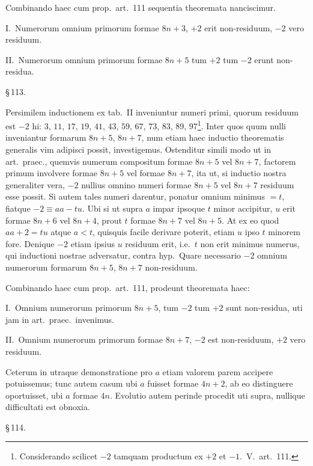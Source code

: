 \documentclass[12pt,a4paper]{article}
\theoremstyle{plain}
\theoremstyle{definition}
\theoremstyle{remark}
\begin{document}
Combinando haec cum prop.\ art.~111 sequentia theoremata nanciscimur.

\textsc{I.}\ Numerorum omnium primorum formae $8n+3$, $+2$ erit non-residuum, $-2$ vero residuum.

\textsc{II.}\ Numerorum omnium primorum formae $8n+5$ tum $+2$ tum $-2$ erunt non-residua.

\begin{center}\S\,113.\end{center}

Persimilem inductionem ex tab.\ II inveniuntur numeri primi, quorum residuum est $-2$ hi: $3$, $11$, $17$, $19$, $41$, $43$, $59$, $67$, $73$, $83$, $89$, $97$\footnote{Considerando scilicet $-2$ tamquam productum ex $+2$ et $-1$.\ V.\ art.~111.}. Inter quos quum nulli inveniantur formarum $8n+5$, $8n+7$, num etiam haec inductio theorematis generalis vim adipisci possit, investigemus. Ostenditur simili modo ut in art.\ praec., quemvis numerum compositum formae $8n+5$ vel $8n+7$, factorem primum involvere formae $8n+5$ vel formae $8n+7$, ita ut, si inductio nostra generaliter vera, $-2$ nullius omnino numeri formae $8n+5$ vel $8n+7$ residuum esse possit. Si autem tales numeri darentur, ponatur omnium minimus $= t$, fiatque $-2 \equiv aa - tu$. Ubi si ut supra $a$ impar ipsoque $t$ minor accipitur, $u$ erit formae $8n+6$ vel $8n+4$, prout $t$ formae $8n+7$ vel $8n+5$. At ex eo quod $aa + 2 = tu$ atque $a < t$, quisquis facile derivare poterit, etiam $u$ ipso $t$ minorem fore. Denique $-2$ etiam ipsius $u$ residuum erit, i.e.\ $t$ non erit minimus numerus, qui inductioni nostrae adversatur, contra hyp.\ Quare necessario $-2$ omnium numerorum formarum $8n+5$, $8n+7$ non-residuum.

Combinando haec cum prop.\ art.~111, prodeunt theoremata haec:

\textsc{I.}\ Omnium numerorum primorum $8n+5$, tum $-2$ tum $+2$ sunt non-residua, uti jam in art.\ praec.\ invenimus.

\textsc{II.}\ Omnium numerorum primorum formae $8n+7$, $-2$ est non-residuum, $+2$ vero residuum.

Ceterum in utraque demonstratione pro $a$ etiam valorem parem accipere potuissemus; tunc autem casum ubi $a$ fuisset formae $4n+2$, ab eo distinguere oportuisset, ubi $a$ formae $4n$. Evolutio autem perinde procedit uti supra, nullique difficultati est obnoxia.

\begin{center}\S\,114.\end{center}
\end{document}
